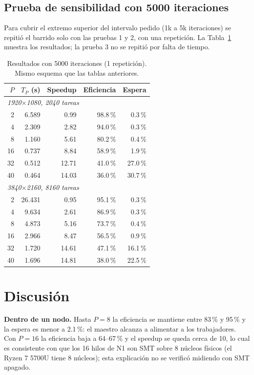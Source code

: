 \documentclass[runningheads]{llncs}
\begin{document}
\subsection{Prueba de sensibilidad con 5000 iteraciones}
Para cubrir el extremo superior del intervalo pedido (1k a 5k iteraciones) se repitió el barrido solo con las
pruebas 1 y 2, con una repetición. La Tabla~\ref{tab:5k} muestra los resultados; la prueba 3 no se repitió por
falta de tiempo.
\begin{table}[t]
\caption{Resultados con 5000 iteraciones (1 repetición). Mismo esquema que las tablas anteriores.}\label{tab:5k}
\centering\footnotesize
\begin{tabular}{|r|r|r|r|r|}\hline
$P$ & $T_P$ (s) & Speedup & Eficiencia & Espera \\ \hline
\multicolumn{5}{|l|}{\textit{1920$\times$1080, 2040 tareas}} \\ \hline
2 & 6.589 & 0.99 & 98.8\,\% & 0.3\,\% \\ \hline
4 & 2.309 & 2.82 & 94.0\,\% & 0.3\,\% \\ \hline
8 & 1.160 & 5.61 & 80.2\,\% & 0.4\,\% \\ \hline
16 & 0.737 & 8.84 & 58.9\,\% & 1.9\,\% \\ \hline
32 & 0.512 & 12.71 & 41.0\,\% & 27.0\,\% \\ \hline
40 & 0.464 & 14.03 & 36.0\,\% & 30.7\,\% \\ \hline
\multicolumn{5}{|l|}{\textit{3840$\times$2160, 8160 tareas}} \\ \hline
2 & 26.431 & 0.95 & 95.1\,\% & 0.3\,\% \\ \hline
4 & 9.634 & 2.61 & 86.9\,\% & 0.3\,\% \\ \hline
8 & 4.873 & 5.16 & 73.7\,\% & 0.4\,\% \\ \hline
16 & 2.966 & 8.47 & 56.5\,\% & 0.9\,\% \\ \hline
32 & 1.720 & 14.61 & 47.1\,\% & 16.1\,\% \\ \hline
40 & 1.696 & 14.81 & 38.0\,\% & 22.5\,\% \\ \hline
\end{tabular}
\end{table}


\section{Discusi\'on}
\textbf{Dentro de un nodo.} Hasta $P=8$ la eficiencia se mantiene entre 83\,\% y 95\,\% y la espera es menor a 2.1\,\%: el
maestro alcanza a alimentar a los trabajadores. Con $P=16$ la eficiencia baja a 64--67\,\% y el speedup se queda cerca de 10,
lo cual es consistente con que los 16 hilos de N1 son SMT sobre 8 n\'ucleos f\'isicos (el Ryzen 7 5700U tiene 8 n\'ucleos);
esta explicaci\'on no se verific\'o midiendo con SMT apagado.
\end{document}
